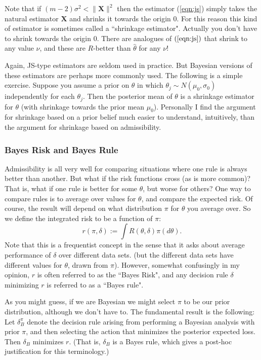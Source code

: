 \documentclass[12pt]{article}
\begin{document}
Note that if $(m-2) \sigma^2<\|{\mathbf X}\|^2$ then the estimator (\ref{eqn:js}) simply takes the natural estimator $\mathbf X$ and shrinks it towards the origin 0.
For this reason this kind of estimator is sometimes called a ``shrinkage estimator". Actually you don't have to shrink towards the origin 0. There
are analogues of $(\ref{eqn:js})$ that shrink to any value $\nu$, and these are $R$-better than $\hat{\theta}$ for any $\nu$!

Again, JS-type estimators are seldom used in practice. But Bayesian versions of these estimators are perhaps more commonly used.
The following is a simple exercise. Suppose you assume a prior on $\theta$ in which $\theta_j \sim N(\mu_0, \sigma_0)$ independently for each $\theta_j$. 
Then the posterior mean of $\theta$ is a shrinkage estimator for $\theta$ (with shrinkage towards the prior mean $\mu_0$). 
Personally I find the argument for shrinkage based on a prior belief much easier to understand, intuitively, than the argument for shrinkage
based on admissibility.


\subsubsection{Bayes Risk and Bayes Rule}

Admissibility is all very well for comparing situations where one rule is always better than another.
But what if the risk functions cross (as is more common)? That is, what if one rule is better for some $\theta$, but worse for others?
One way to compare rules is to average over values for $\theta$, and compare the expected risk. Of course, the result
will depend on what distribution $\pi$ for $\theta$ you average over. So we define the integrated risk to be  a function of $\pi$:
\begin{equation}
r(\pi,\delta) := \int R(\theta,\delta) \pi(d\theta).
\end{equation}
Note that this is a frequentist concept in the sense that it asks about average performance of $\delta$ over different data sets.
(but the different data sets have different values for $\theta$, drawn from $\pi$). However, somewhat confusingly in my opinion,
$r$ is often referred to as the ``Bayes Risk", and any decision rule $\delta$ minimizing $r$ is referred to as a ``Bayes rule".

As you might guess, if we are Bayesian we might select $\pi$ to be our prior distribution, although we don't have to.
The fundamental result is the following:
Let $\delta_B^\pi$ denote the decision rule arising from performing a Bayesian analysis with prior $\pi$, and then
selecting the action that minimizes the posterior expected loss. Then $\delta_B$ minimizes $r$. (That is, $\delta_B$ is a Bayes rule,
which gives a post-hoc justification for this terminology.)
\end{document}
